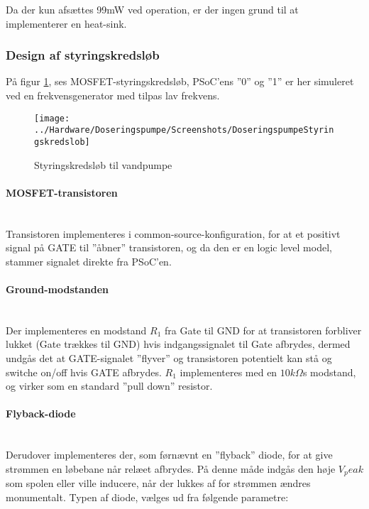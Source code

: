Da der kun afsættes 99mW ved operation, er der ingen grund til at implementerer en heat-sink.

\subsubsection{Design af styringskredsløb}
På figur \ref{screenshot:Styringskreds}, ses MOSFET-styringskredsløb, PSoC'ens ”0” og ”1” er her simuleret ved en frekvensgenerator med tilpas lav frekvens.

\begin{figure}[!h]
	\centering
	\texttt{[image: ../Hardware/Doseringspumpe/Screenshots/DoseringspumpeStyringskredslob]}
	\caption{Styringskredsløb til vandpumpe}
	\label{screenshot:Styringskreds}
\end{figure}

\paragraph{MOSFET-transistoren} \hspace{0pt} \\
Transistoren implementeres i common-source-konfiguration, for at et positivt signal på GATE til ”åbner” transistoren, og da den er en logic level model, stammer signalet direkte fra PSoC'en. 

\paragraph{Ground-modstanden} \hspace{0pt} \\
Der implementeres en modstand $R_1$ fra Gate til GND for at transistoren forbliver lukket (Gate trækkes til GND) hvis indgangssignalet til Gate afbrydes, dermed undgås det at GATE-signalet ”flyver” og transistoren potentielt kan stå og switche on/off hvis GATE afbrydes. $R_1$ implementeres med en $10k\Omega$s modstand, og virker som en standard ”pull down” resistor.

\paragraph{Flyback-diode} \hspace{0pt} \\
Derudover implementeres der, som førnævnt en ”flyback” diode, for at give strømmen en løbebane når relæet afbrydes. På denne måde indgås den høje $V_peak$ som spolen eller ville inducere, når der lukkes af for strømmen ændres monumentalt. Typen af diode, vælges ud fra følgende parametre:


